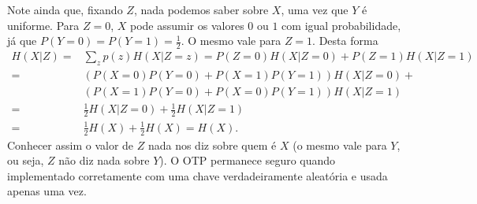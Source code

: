 \begin{questions}
\begin{solution}
Note ainda que, fixando $Z$, nada podemos saber sobre $X$, uma vez que $Y$ é uniforme.
Para $Z=0$, $X$ pode assumir os valores $0$ ou $1$ com igual probabilidade, já que 
$P(Y=0)=P(Y=1)=\frac{1}{2}$. O mesmo vale para $Z=1$. Desta forma 
\begin{align}
H(X|Z) =& \sum_z p(z) H(X|Z=z) = P(Z=0) H(X|Z=0) + P(Z=1) H(X|Z=1) \\
  =& (P(X=0)P(Y=0)+P(X=1)P(Y=1)) H(X|Z=0) + \\
  &(P(X=1)P(Y=0)+P(X=0)P(Y=1)) H(X|Z=1) \\
  =& \frac{1}{2} H(X|Z=0) + \frac{1}{2} H(X|Z=1) \\
  =& \frac{1}{2} H(X) + \frac{1}{2} H(X) = H(X).
\end{align}
Conhecer assim o valor de $Z$ nada nos diz sobre quem é $X$ (o mesmo vale para $Y$, ou seja, $Z$ não diz nada sobre $Y$).
O OTP permanece seguro quando implementado corretamente com uma chave 
verdadeiramente aleatória e usada apenas uma vez.

\end{solution}

\end{questions}
